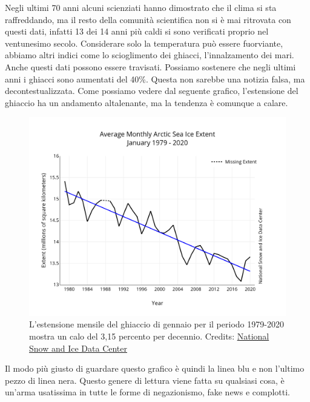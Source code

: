\documentclass[12pt]{book} %
\begin{document}
Negli ultimi 70 anni alcuni scienziati hanno dimostrato che il clima si sta raffreddando, ma il resto della comunità
scientifica non si è mai ritrovata con questi dati, infatti 13 dei 14 anni più caldi si sono verificati proprio nel
ventunesimo secolo. Considerare solo la temperatura può essere fuorviante, abbiamo altri indici come lo scioglimento
dei ghiacci, l'innalzamento dei mari. Anche questi dati possono essere travisati. Possiamo sostenere che negli ultimi anni i ghiacci sono aumentati del 40\%. Questa non sarebbe una notizia falsa, ma decontestualizzata. Come possiamo vedere dal seguente grafico, l'estensione del ghiaccio ha un andamento altalenante, ma la tendenza è comunque a calare.

\needspace{4cm}
\begin{figure}[H]
  \centering
  \includegraphics[width=0.95\linewidth]{images/Libro-img021.png}
  \caption{L'estensione mensile del ghiaccio di gennaio per il
periodo 1979-2020 mostra un calo del 3,15 percento per decennio. Credits: \href{https://nsidc.org/arcticseaicenews/2020/02/}{National Snow and Ice Data Center}}
\end{figure}

Il modo più giusto di guardare questo grafico è quindi la linea blu e non l'ultimo pezzo di linea
nera. Questo genere di lettura viene fatta su qualsiasi cosa, è un'arma usatissima in tutte le
forme di negazionismo, fake news e complotti.
\end{document}
